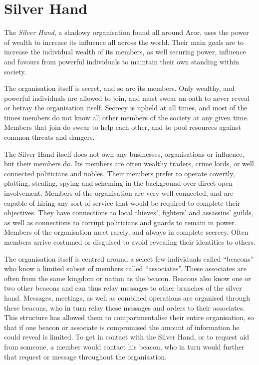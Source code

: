 \section{Silver Hand}
\label{sec:Silver Hand}

The \emph{Silver Hand}, a shadowy organisation found all around Aror, uses the
power of wealth to increase its influence all across the world. Their main goals
are to increase the individual wealth of its members, as well securing power,
influence and favours from powerful individuals to maintain their own standing
within society.

The organisation itself is secret, and so are its members. Only wealthy, and
powerful individuals are allowed to join, and must swear an oath to never
reveal or betray the organisation itself. Secrecy is upheld at all times, and
most of the times members do not know all other members of the society at any
given time. Members that join do swear to help each other, and to pool
resources against common threats and dangers.

The Silver Hand itself does not own any businesses, organisations or
influence, but their members do. Its members are often wealthy traders, crime
lords, or well connected politicians and nobles. Their members prefer to
operate covertly, plotting, stealing, spying and scheming in the background
over direct open involvement. Members of the organisation are very well
connected, and are capable of hiring any sort of service that would be
required to complete their objectives. They have connections to local
thieves', fighters' and assassins' guilds, as well as connections to corrupt
politicians and guards to remain in power. Members of the organisation meet
rarely, and always in complete secrecy. Often members arrive costumed or
disguised to avoid revealing their identities to others.

The organisation itself is centred around a select few individuals called
``beacons'' who know a limited subset of members called ``associates''. These
associates are often from the same kingdom or nation as the beacon. Beacons
also know one or two other beacons and can thus relay messages to other
branches of the silver hand. Messages, meetings, as well as combined
operations are organised through these beacons, who in turn relay these
messages and orders to their associates. This structure has allowed them
to compartmentalise their entire organisation, so that if one beacon or
associate is compromised the amount of information he could reveal is limited.
To get in contact with the Silver Hand, or to request aid from someone, a
member would contact his beacon, who in turn would further that request or
message throughout the organisation.

